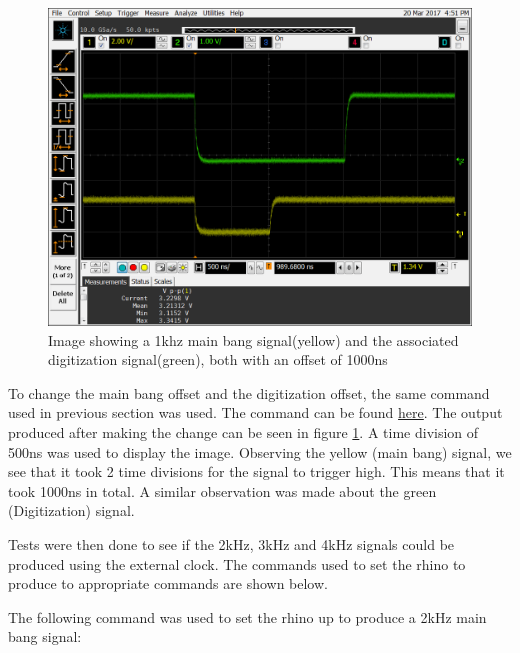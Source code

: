 \documentclass[12pt, a4paper]{article}
\begin{document}
	\begin{figure}[t]
		\centering
		\includegraphics[width=13cm]{1khz_ext_mb_d_offset_1000ns}
		\caption{Image showing a 1khz main bang signal(yellow) and the associated digitization signal(green), both with an offset of 1000ns}
		\label{fig:1khz_ext_sig_1000ns_offset}
	\end{figure}

To change the main bang offset and the digitization offset, the same command used in previous section was used. The command can be found \hyperlink{1000ns_offset}{here}. The output produced after making the change can be seen in figure \ref{fig:1khz_ext_sig_1000ns_offset}. A time division of 500ns was used to display the image. Observing the yellow (main bang) signal, we see that it took 2 time divisions for the signal to trigger high. This means that it took 1000ns in total. A similar observation was made about the green (Digitization) signal.

Tests were then done to see if the 2kHz, 3kHz and 4kHz signals could be produced using the external clock. The commands used to set the rhino to produce to appropriate commands are shown below.

The following command was used to set the rhino up to produce a 2kHz main bang signal:

\end{document}

